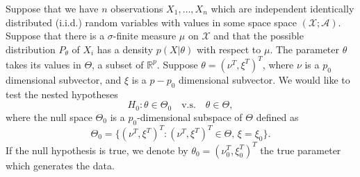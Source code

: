 \documentclass[3p]{elsarticle}
\theoremstyle{plain}
\theoremstyle{definition}
\theoremstyle{remark}
\begin{document}









Suppose that we have $n$ observations $X_1,\ldots,X_n$ which are independent identically distributed (i.i.d.) random variables with values in some space space $(\mathcal{X};\mathscr{A})$.
Suppose that there is a $\sigma$-finite measure $\mu$ on $\mathcal{X}$ and that the  possible distribution $P_\theta$ of $X_i$ has a density $p(X|\theta)$ with respect to $\mu$.
The parameter $\theta$ takes its values in $\Theta$, a subset of $\mathbb{R}^{p}$.
Suppose $\theta=(\nu^T,\xi^T)^T$, where $\nu$ is a $p_0$ dimensional subvector, and $\xi$ is a $p-p_0$ dimensional subvector.
 We would like to test the nested hypotheses
\begin{equation*}
    H_0:\theta\in\Theta_0\quad \text{v.s.}\quad \theta\in\Theta,
\end{equation*}
where the null space $\Theta_0$ is a $p_0$-dimensional subspace of $\Theta$ defined as
\begin{equation*}
    \Theta_0=\{(\nu^T,\xi^T)^T:(\nu^T,\xi^T)^T\in\Theta, \, \xi=\xi_0\}.
\end{equation*}
If the null hypothesis is true, we denote by $\theta_0=(\nu_0^T,\xi_0^T)^T$ the true parameter which generates the data.
\end{document}
